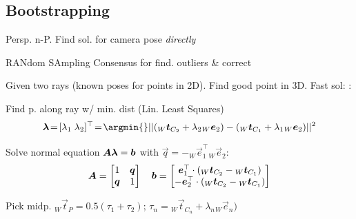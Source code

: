 \subsection{Bootstrapping}

 {\scriptsize Persp. n-P.}
Find sol. for camera pose \textit{directly}

 {\scriptsize RANdom SAmpling Consensus} for find. outliers \& correct

 Given two rays (known poses for points in 2D).
Find good point in 3D. Fast sol: :

 Find p. along ray w/ min. dist (Lin. Least Squares)
\[
    \vec{\lambda}\! =\! [\lambda_1 \; \lambda_2]^\top\! = \! \argmin{} ||({_W}\vec{t}_{C_2} + \lambda_2 {_W}\vec{e}_2) - ({_W}\vec{t}_{C_1} + \lambda_1 {_W}\vec{e}_2)||^2
\]

\rmvspace
{} Solve normal equation $\bm{A} \bm{\lambda} = \bm{b}$ with $\vec{q} = -{_W}\vec{e}^\top_1 {_W}\vec{e}_2$:
\[
    \bm{A} = \begin{bmatrix}
        1       & \bm{q} \\
        \bm{q} & 1
    \end{bmatrix}
    \quad
    \bm{b} = \begin{bmatrix}
        \bm{e}_1^\top \cdot ({_W}\bm{t}_{C_2} - {_W}\bm{t}_{C_1}) \\
        -\bm{e}_2^\top \cdot ({_W}\bm{t}_{C_2} - {_W}\bm{t}_{C_1})
    \end{bmatrix}
\]

 Pick midp. ${_W}\vec{t}_P \! = \! 0.5(\tau_1 \! + \! \tau_2)$; $\tau_n \! = \! {_W}\vec{t}_{C_n} + \lambda_n{_W}\vec{e}_n)$
